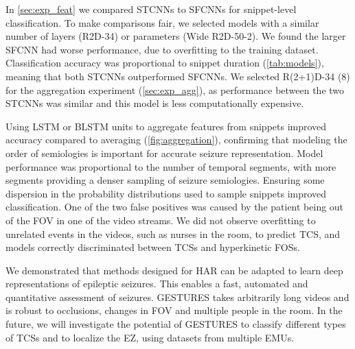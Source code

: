 In \cref{sec:exp_feat} we compared \acp{STCNN} to \acp{SFCNN} for snippet-level classification.
To make comparisons fair, we selected models with a similar number of layers (R2D-34) or parameters (Wide R2D-50-2).
We found the larger \ac{SFCNN} had worse performance, due to overfitting to the training dataset.
Classification accuracy was proportional to snippet duration (\cref{tab:models}), meaning that both \acp{STCNN} outperformed \acp{SFCNN}.
We selected R(2+1)D-34 (8) for the aggregation experiment (\cref{sec:exp_agg}), as performance between the two \acp{STCNN} was similar and this model is less computationally expensive.

Using \ac{LSTM} or \ac{BLSTM} units to aggregate features from snippets improved accuracy compared to averaging (\cref{fig:aggregation}), confirming that modeling the order of semiologies is important for accurate seizure representation.
Model performance was proportional to the number of temporal segments, with more segments providing a denser sampling of seizure semiologies. %
Ensuring some dispersion in the probability distributions used to sample snippets improved classification.
One of the two false positives was caused by the patient being out of the \ac{FOV} in one of the video streams.
We did not observe overfitting to unrelated events in the videos, such as nurses in the room, to predict \ac{TCS}, and models correctly discriminated between \acp{TCS} and hyperkinetic \acp{FOS}.

We demonstrated that methods designed for \ac{HAR} can be adapted to learn deep representations of epileptic seizures.
This enables a fast, automated and quantitative assessment of seizures.
\Ac{GESTURES} takes arbitrarily long videos and is robust to occlusions, changes in \ac{FOV} and multiple people in the room.
In the future, we will investigate the potential of \ac{GESTURES} to classify different types of \acp{TCS} and to localize the \ac{EZ}, using datasets from multiple \acp{EMU}.
